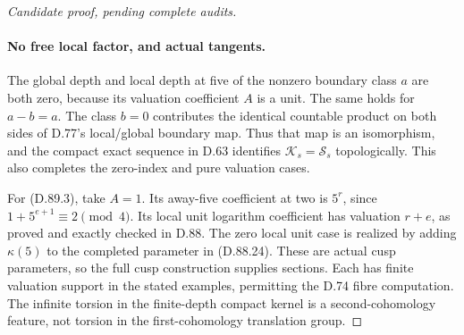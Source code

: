 \begin{proof}[Candidate proof, pending complete audits]
\paragraph{No free local factor, and actual tangents.}
The global depth and local depth at five of the nonzero
boundary class \(a\) are both zero, because its valuation
coefficient \(A\) is a unit. The same holds for \(a-b=a\).
The class \(b=0\) contributes the identical countable
product on both sides of D.77's local/global boundary map.
Thus that map is an isomorphism, and the compact exact
sequence in D.63 identifies \(\mathcal K_s=\mathcal S_s\)
topologically. This also completes the zero-index and pure
valuation cases.

For (D.89.3), take \(A=1\). Its away-five coefficient
at two is \(5^r\), since \(1+5^{e+1}\equiv2\pmod4\).
Its local unit logarithm coefficient has valuation \(r+e\),
as proved and exactly checked in D.88. The zero local unit
case is realized by adding \(\kappa(5)\) to the completed
parameter in (D.88.24). These are actual cusp parameters,
so the full cusp construction supplies sections. Each has
finite valuation support in the stated examples, permitting
the D.74 fibre computation. The infinite torsion in the
finite-depth compact kernel is a second-cohomology feature,
not torsion in the first-cohomology translation group.
\end{proof}
